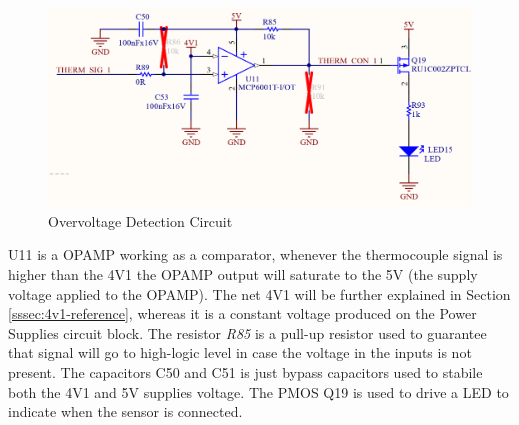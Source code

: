 		\begin{figure}[htbp]
			\centering
				\includegraphics[width=.8\textwidth]{figuras/fig-overvoltage-sensor-detection}
			\caption{Overvoltage Detection Circuit}
			\label{fig:overvoltage-sensor-detection}
		\end{figure}
		
	U11 is a OPAMP working as a comparator, whenever the thermocouple signal is higher than the 4V1 the OPAMP output will saturate to the 5V (the supply voltage applied to the OPAMP). The net 4V1 will be further explained in Section \ref{sssec:4v1-reference}, whereas it is a constant voltage produced on the Power Supplies circuit block. The resistor \textit{R85} is a pull-up resistor used to guarantee that signal will go to high-logic level in case the voltage in the inputs is not present. The capacitors C50 and C51 is just bypass capacitors used to stabile both the 4V1 and 5V supplies voltage. The PMOS Q19 is used to drive a LED to indicate when the sensor is connected.